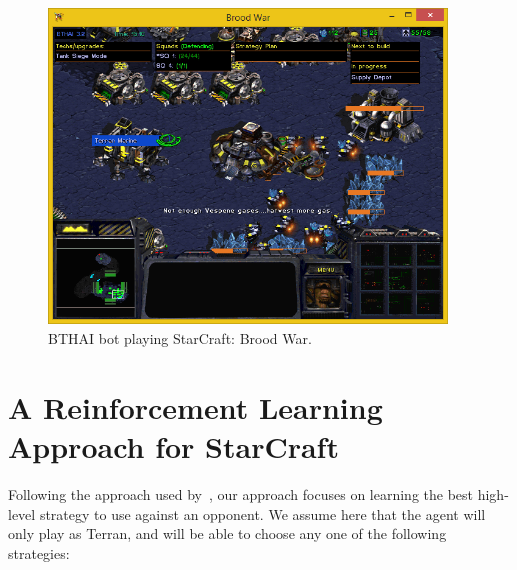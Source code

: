\begin{figure}[ht]
\centering
\includegraphics[width=400px]{images/game-play}
\caption{BTHAI bot playing StarCraft: Brood War.}
\label{fig:game-play}
\end{figure}



\section{A Reinforcement Learning Approach for StarCraft}
\label{sec:rl-sc}

Following the approach used by~\cite{amato2010highlevel}, our approach focuses on learning the best high-level strategy to use against an opponent. 
We assume here that the agent will only play as Terran, and will be able to choose any one of the following strategies:


